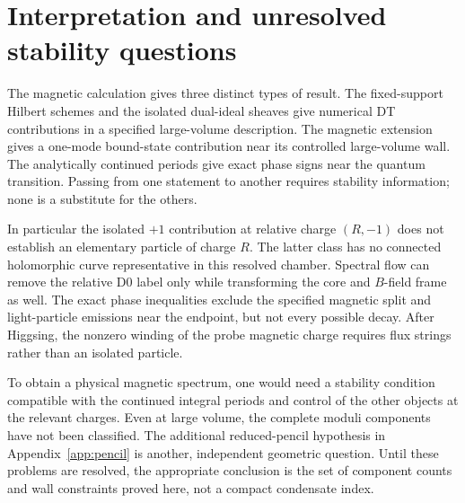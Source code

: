 \section{Interpretation and unresolved stability questions}

The magnetic calculation gives three distinct types of result.
The fixed-support Hilbert schemes and the isolated dual-ideal
sheaves give numerical DT contributions in a specified
large-volume description. The magnetic extension gives a
one-mode bound-state contribution near its controlled
large-volume wall. The analytically continued periods give
exact phase signs near the quantum transition. Passing from
one statement to another requires stability information;
none is a substitute for the others.

In particular the isolated $+1$ contribution at relative
charge $(R,-1)$ does not establish an elementary particle of
charge $R$. The latter class has no connected holomorphic
curve representative in this resolved chamber. Spectral flow
can remove the relative D0 label only while transforming the
core and $B$-field frame as well. The exact phase inequalities
exclude the specified magnetic split and light-particle
emissions near the endpoint, but not every possible decay.
After Higgsing, the nonzero winding of the probe magnetic
charge requires flux strings rather than an isolated particle.

To obtain a physical magnetic spectrum, one would need a
stability condition compatible with the continued integral
periods and control of the other objects at the relevant
charges. Even at large volume, the complete moduli components
have not been classified. The additional reduced-pencil
hypothesis in Appendix~\ref{app:pencil} is another, independent
geometric question. Until these problems are resolved, the
appropriate conclusion is the set of component counts and
wall constraints proved here, not a compact condensate index.

